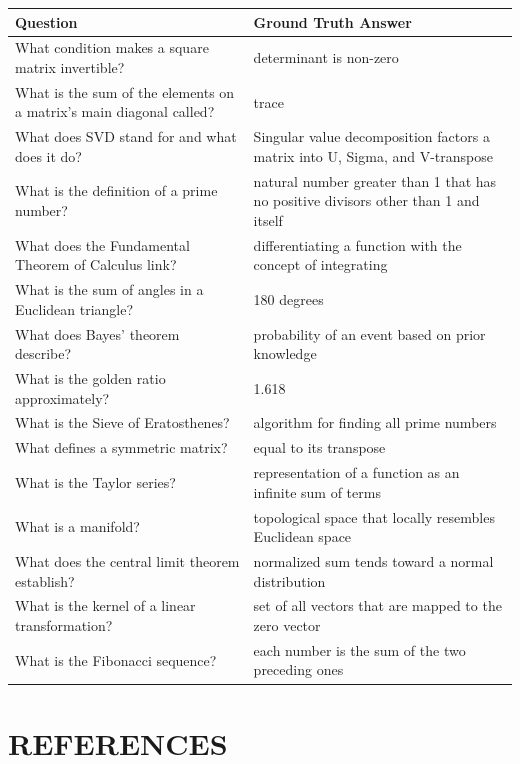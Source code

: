 \documentclass[12pt,a4paper]{article}
\begin{document}
\begin{table}[h]
\centering
\scriptsize
\begin{tabular}{|p{7cm}|p{6cm}|}
\hline
\textbf{Question} & \textbf{Ground Truth Answer} \\ \hline
What condition makes a square matrix invertible? & determinant is non-zero \\ \hline
What is the sum of the elements on a matrix's main diagonal called? & trace \\ \hline
What does SVD stand for and what does it do? & Singular value decomposition factors a matrix into U, Sigma, and V-transpose \\ \hline
What is the definition of a prime number? & natural number greater than 1 that has no positive divisors other than 1 and itself \\ \hline
What does the Fundamental Theorem of Calculus link? & differentiating a function with the concept of integrating \\ \hline
What is the sum of angles in a Euclidean triangle? & 180 degrees \\ \hline
What does Bayes' theorem describe? & probability of an event based on prior knowledge \\ \hline
What is the golden ratio approximately? & 1.618 \\ \hline
What is the Sieve of Eratosthenes? & algorithm for finding all prime numbers \\ \hline
What defines a symmetric matrix? & equal to its transpose \\ \hline
What is the Taylor series? & representation of a function as an infinite sum of terms \\ \hline
What is a manifold? & topological space that locally resembles Euclidean space \\ \hline
What does the central limit theorem establish? & normalized sum tends toward a normal distribution \\ \hline
What is the kernel of a linear transformation? & set of all vectors that are mapped to the zero vector \\ \hline
What is the Fibonacci sequence? & each number is the sum of the two preceding ones \\ \hline
\end{tabular}
\end{table}

\newpage
\section*{REFERENCES}
\end{document}
